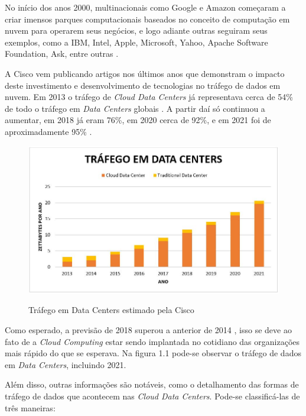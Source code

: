 No início dos anos 2000, multinacionais como Google e Amazon começaram a criar imensos parques computacionais baseados no conceito de computação em nuvem para operarem seus negócios, e logo adiante outras seguiram seus exemplos, como a IBM, Intel, Apple, Microsoft, Yahoo, Apache Software Foundation, Ask, entre outras \cite {taurion2009cloud}.

A Cisco vem publicando artigos nos últimos anos que demonstram o impacto deste investimento e desenvolvimento de tecnologias no tráfego de dados em nuvem. Em 2013 o tráfego de \emph{Cloud Data Centers} já representava cerca de 54\% de todo o tráfego em \emph{Data Centers} globais \cite {index2014forecast}. A partir daí só continuou a aumentar, em 2018 já eram 76\%, em 2020 cerca de 92\%, e em 2021 foi de aproximadamente 95\% \cite {index2018forecast}.

\begin{figure}[htp]
    \centering
    \includegraphics[width=12cm]{1-intro/Figura_1.jpg}
    \caption{Tráfego em Data Centers estimado pela Cisco}
    \cite {index2018forecast}
    \label{fig:trafegoestimado}
\end{figure}

Como esperado, a previsão de 2018 \cite{index2018forecast} superou a anterior de 2014 \cite{index2014forecast}, isso se deve ao fato de a \emph{Cloud Computing} estar sendo implantada no cotidiano das organizações mais rápido do que se esperava. Na figura 1.1 pode-se observar o tráfego de dados em \emph{Data Centers}, incluindo 2021.

Além disso, outras informações são notáveis, como o detalhamento das formas de tráfego de dados que acontecem nas \emph{Cloud Data Centers}. Pode-se classificá-las de três maneiras:

